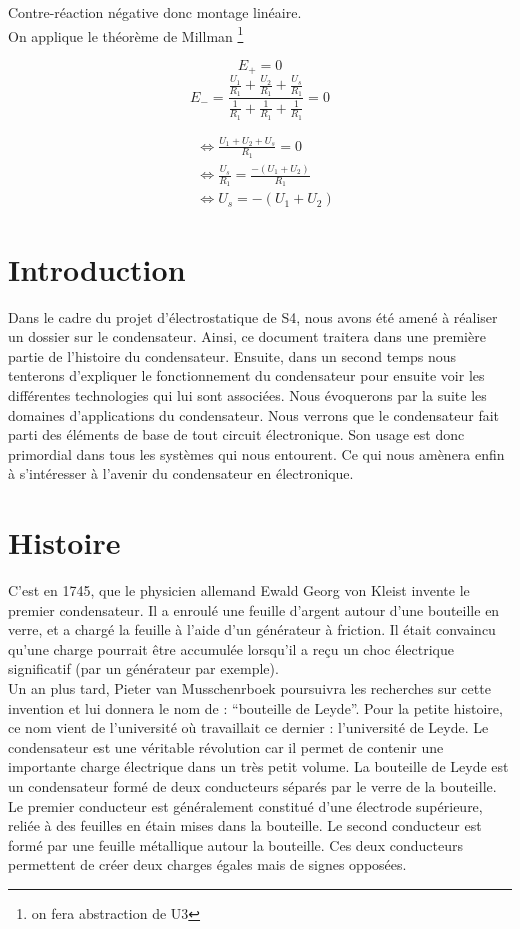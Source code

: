 \documentclass[12pt]{report}
\begin{document}
Contre-réaction négative donc montage linéaire. \\
On applique le théorème de Millman \footnote{on fera abstraction de U3}

$$E_+=0$$
$$ E_- = \frac{ \frac{U_1}{R_1} + \frac{U_2}{R_1} + \frac{U_s}{R_1} }{\frac{1}{R_1} + \frac{1}{R_1} + \frac{1}{R_1}}=0$$

\begin{align}
&\Leftrightarrow \frac{U_1+U_2+U_s}{R_1}=0 \\
&\Leftrightarrow \frac{U_s}{R_1} = \frac{-(U_1+U_2)}{R_1} \\
&\Leftrightarrow U_s = -(U_1+U_2)
\end{align}
\chapter{Introduction} 
Dans le cadre du projet d'électrostatique de S4, nous avons été amené à réaliser un dossier sur le condensateur. Ainsi, ce document traitera dans une première partie de l'histoire du condensateur. Ensuite, dans un second temps nous tenterons d'expliquer le fonctionnement du condensateur pour ensuite voir les différentes technologies qui lui sont associées. Nous évoquerons par la suite les domaines d'applications du condensateur. Nous verrons que le condensateur fait parti des éléments de base de tout circuit électronique. Son usage est donc primordial dans tous les systèmes qui nous entourent. Ce qui nous amènera enfin à s'intéresser à l'avenir du condensateur en électronique.
\chapter{Histoire} 

C’est en 1745, que le physicien allemand Ewald Georg von Kleist invente le premier condensateur. Il a enroulé une feuille d'argent autour d'une bouteille en verre,  et  a  chargé  la  feuille  à  l'aide  d'un  générateur  à  friction. Il était convaincu  qu'une  charge  pourrait  être  accumulée  lorsqu'il  a  reçu  un  choc  électrique  significatif (par un générateur par exemple). \\

Un an plus tard, Pieter van Musschenrboek poursuivra les recherches sur cette invention et lui donnera le nom de : “bouteille de Leyde”. Pour la petite histoire, ce nom vient de l’université où travaillait ce dernier : l’université de Leyde. Le condensateur est une véritable révolution car il permet de contenir une importante charge électrique dans un très petit volume.  La bouteille de Leyde est un condensateur formé de deux conducteurs séparés par le verre de la bouteille. Le premier conducteur est généralement constitué d'une électrode supérieure, reliée à des feuilles en étain mises dans  la  bouteille.  Le  second  conducteur  est  formé  par  une feuille  métallique  autour la  bouteille. Ces deux conducteurs permettent de créer deux charges égales mais de signes opposées. \\
\end{document}
